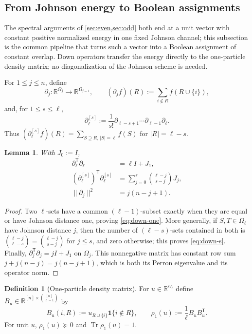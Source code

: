 \documentclass[11pt]{article}
\newtheorem{lemma}[lemma]{Lemma}
\theoremstyle{definition}
\newtheorem{definition}[definition]{Definition}
\theoremstyle{remark}
\newcommand{\1}{\mathbf 1}
\newcommand{\rhoone}{\rho_1}
\DeclareMathOperator{\Tr}{Tr}
\numberwithin{equation}{section}
\begin{document}
\subsection{From Johnson energy to Boolean assignments}
\label{sec:common-recovery}

The spectral arguments of
\cref{sec:even,sec:odd} both end at a unit vector with
constant positive normalized energy in one fixed Johnson channel; this
subsection is the common pipeline that turns such a vector into a
Boolean assignment of constant overlap.  Down operators transfer the
energy directly to the one-particle density matrix; no diagonalization
of the Johnson scheme is needed.

For $1\le j\le n$, define
\[
 \partial_j:\mathbb R^{\Omega_j}\longrightarrow\mathbb R^{\Omega_{j-1}},
 \qquad
 (\partial_jf)(R):=\sum_{i\notin R}f(R\cup\{i\}),
\]
and, for $1\le s\le\ell$,
\begin{equation}\label{eq:iterated-down}
 \partial_\ell^{[s]}
 :=\frac1{s!}\partial_{\ell-s+1}\cdots\partial_{\ell-1}\partial_\ell.
\end{equation}
Thus
$(\partial_\ell^{[s]}f)(R)=\sum_{S\supseteq R,\,|S|=\ell}f(S)$ for
$|R|=\ell-s$.

\begin{lemma}\label{lem:down-identities}
With $J_0:=I$,
\begin{align}
 \partial_\ell^{\mathsf T}\partial_\ell&=\ell I+J_1,
 \label{eq:down-one}\\
 (\partial_\ell^{[s]})^{\mathsf T}\partial_\ell^{[s]}
 &=\sum_{j=0}^s\binom{\ell-j}{s-j}J_j,
 \label{eq:down-s}\\
 \|\partial_j\|^2&=j(n-j+1).
 \label{eq:down-norm}
\end{align}
\end{lemma}
\begin{proof}
Two $\ell$-sets have a common $(\ell-1)$-subset exactly when they are
equal or have Johnson distance one, proving \cref{eq:down-one}.  More
generally, if $S,T\in\Omega_\ell$ have Johnson distance $j$, then the
number of $(\ell-s)$-sets contained in both is
$\binom{\ell-j}{\ell-s}=\binom{\ell-j}{s-j}$ for $j\le s$, and zero
otherwise; this proves \cref{eq:down-s}.  Finally,
$\partial_j^{\mathsf T}\partial_j=jI+J_1$ on $\Omega_j$.  This
nonnegative matrix has constant row sum $j+j(n-j)=j(n-j+1)$, which is
both its Perron eigenvalue and its operator norm.
\end{proof}

\begin{definition}[One-particle density matrix]\label{def:rdm}
For $u\in\mathbb R^{\Omega_\ell}$ define
$B_u\in\mathbb R^{[n]\times\binom{[n]}{\ell-1}}$ by
\[
 B_u(i,R):=u_{R\cup\{i\}}\1\{i\notin R\},
 \qquad
 \rhoone(u):=\frac1\ell B_uB_u^{\mathsf T}.
\]
For unit $u$, $\rhoone(u)\succeq0$ and $\Tr\rhoone(u)=1$.
\end{definition}
\end{document}
